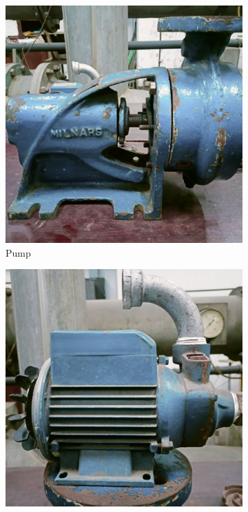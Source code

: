 \documentclass[12pt]{article}
\begin{document}
\pagebreak
\begin{figure}
  \centering

  \begin{subfigure}{0.3\textwidth}
      \includegraphics[width=\linewidth]{img/p01.jpg}
      \caption{Pump}  
  \end{subfigure}
  \hfill
  \begin{subfigure}{0.3\textwidth}
      \includegraphics[width=\linewidth]{img/02.jpg}

\end{subfigure}
\end{figure}
\end{document}
